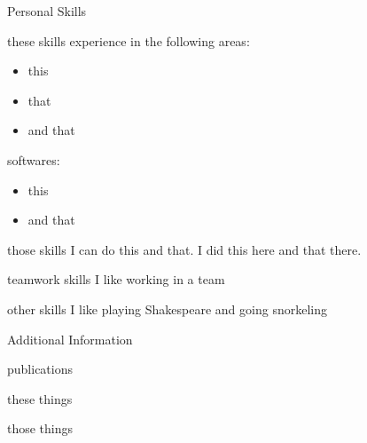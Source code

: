 \documentclass[a4paper,11pt]{iCV}
\begin{document}
\begin{iCVsection}{Personal Skills}

\begin{iCVlanguagetable}{}
\end{iCVlanguagetable}

\begin{iCVentry}{these skills}
experience in the following areas:
\begin{itemize}[noitemsep,leftmargin=1cm]
	\item this
	\item that
	\item and that
\end{itemize}

softwares:
\begin{itemize}[noitemsep,leftmargin=1cm]
	\item this
	\item and that
\end{itemize}
\end{iCVentry}

\begin{iCVentry}{those skills}
I can do this and that. I did this here and that there.
\end{iCVentry}

\begin{iCVentry}{teamwork skills}
I like working in a team
\end{iCVentry}

\begin{iCVentry}{other skills}
I like playing Shakespeare and going snorkeling
\end{iCVentry}

\end{iCVsection}

\begin{iCVsection}{Additional Information}

\begin{iCVgroup}{publications}
\end{iCVgroup}

\begin{iCVgroup}{these things}
\end{iCVgroup}

\begin{iCVgroup}{those things}
\end{iCVgroup}

\end{iCVsection}

\iCVdate
\end{document}
